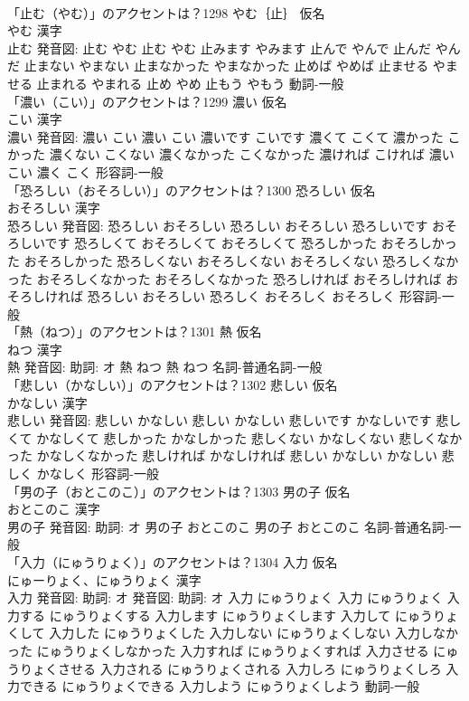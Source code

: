 \documentclass[8pt]{extreport}
\begin{document}
\begin{CJK}{UTF8}{min}
\\	「止む（やむ）」のアクセントは？1298	やむ｛止｝ 仮名　
\\	やむ 漢字　
\\	止む 発音図:	止む やむ		止む やむ 止みます やみます 止んで やんで 止んだ やんだ 止まない やまない 止まなかった やまなかった 止めば やめば 止ませる やませる 止まれる やまれる 止め やめ 止もう やもう				動詞-一般 
\\	「濃い（こい）」のアクセントは？1299	濃い 仮名　
\\	こい 漢字　
\\	濃い 発音図:	濃い こい		濃い こい 濃いです こいです 濃くて こくて 濃かった こかった 濃くない こくない 濃くなかった こくなかった 濃ければ こければ 濃い こい 濃く こく				形容詞-一般 
\\	「恐ろしい（おそろしい）」のアクセントは？1300	恐ろしい 仮名　
\\	おそろしい 漢字　
\\	恐ろしい 発音図:	恐ろしい おそろしい		恐ろしい おそろしい 恐ろしいです おそろしいです 恐ろしくて おそろしくて おそろしくて 恐ろしかった おそろしかった おそろしかった 恐ろしくない おそろしくない おそろしくない 恐ろしくなかった おそろしくなかった おそろしくなかった 恐ろしければ おそろしければ おそろしければ 恐ろしい おそろしい 恐ろしく おそろしく おそろしく				形容詞-一般 
\\	「熱（ねつ）」のアクセントは？1301	熱 仮名　
\\	ねつ 漢字　
\\	熱 発音図: 助詞: オ	熱 ねつ		熱 ねつ				名詞-普通名詞-一般 
\\	「悲しい（かなしい）」のアクセントは？1302	悲しい 仮名　
\\	かなしい 漢字　
\\	悲しい 発音図:	悲しい かなしい		悲しい かなしい 悲しいです かなしいです 悲しくて かなしくて 悲しかった かなしかった 悲しくない かなしくない 悲しくなかった かなしくなかった 悲しければ かなしければ 悲しい かなしい かなしい 悲しく かなしく				形容詞-一般 
\\	「男の子（おとこのこ）」のアクセントは？1303	男の子 仮名　
\\	おとこのこ 漢字　
\\	男の子 発音図: 助詞: オ	男の子 おとこのこ		男の子 おとこのこ				名詞-普通名詞-一般 
\\	「入力（にゅうりょく）」のアクセントは？1304	入力 仮名　
\\	にゅーりょく、にゅうりょく 漢字　
\\	入力 発音図: 助詞: オ 発音図: 助詞: オ	入力 にゅうりょく		入力 にゅうりょく 入力する にゅうりょくする 入力します にゅうりょくします 入力して にゅうりょくして 入力した にゅうりょくした 入力しない にゅうりょくしない 入力しなかった にゅうりょくしなかった 入力すれば にゅうりょくすれば 入力させる にゅうりょくさせる 入力される にゅうりょくされる 入力しろ にゅうりょくしろ 入力できる にゅうりょくできる 入力しよう にゅうりょくしよう				動詞-一般 

\end{CJK}
\end{document}
